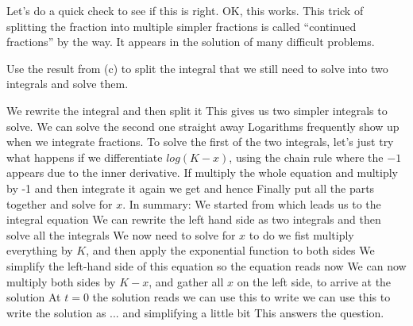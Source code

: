 Let's do a quick check to see if this is right. 
OK, this works. This trick of splitting the fraction into multiple simpler fractions is called ``continued fractions'' by the way. It appears in the solution of many difficult problems. 

\subquestion
Use the result from (c) to split the integral that we still need to solve into two integrals and solve them. 

\solution 
We rewrite the integral
and then split it 
This gives us two simpler integrals to solve. We can solve the second one straight away
Logarithms frequently show up when we integrate fractions. To solve the first of the two integrals, let's just try what happens if we differentiate $log(K-x)$, using the chain rule 
where the $-1$ appears due to the inner derivative. If multiply the whole equation and multiply by -1 and then integrate it again we get 
and hence 
\subquestion Finally put all the parts together and solve for $x$. 
\solution
In summary: We started from 
which leads us to the integral equation 
We can rewrite the left hand side as two integrals 
and then solve all the integrals
We now need to solve for $x$ to do we fist multiply everything by $K$,
and then apply the exponential function to both sides
We simplify the left-hand side of this equation 
so the equation reads now 
We can now multiply both sides by $K-x$, 
and gather all $x$ on the left side, 
to arrive at the solution 
At $t=0$ the solution reads 
we can use this to write 
we can use this to write the solution as 
... and simplifying a little bit 
This answers the question. 

